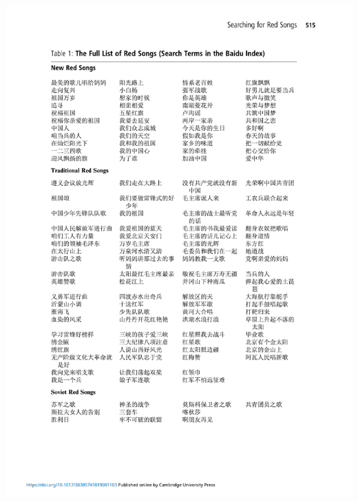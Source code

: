 \documentclass[
  10pt,
  ignorenonframetext,
]{beamer}
\begin{document}
\begin{frame}
\begin{center}\includegraphics[width=0.9\linewidth]{Figs/Examples/yan_table} \end{center}
\end{frame}
\end{document}
